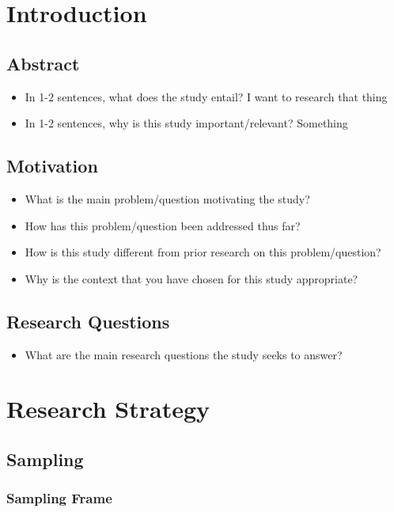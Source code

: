 \documentclass[12pt]{article}
\begin{document}
\section{Introduction}

\subsection{Abstract}

\begin{itemize}
\item In 1-2 sentences, what does the study entail? I want to research that thing
\item In 1-2 sentences, why is this study important/relevant? Something
\end{itemize}

\subsection{Motivation}

\begin{itemize}
\item What is the main problem/question motivating the study?
\item How has this problem/question been addressed thus far?
\item How is this study different from prior research on this problem/question? 
\item Why is the context that you have chosen for this study appropriate?
\end{itemize}

\subsection{Research Questions}

\begin{itemize}
\item What are the main research questions the study seeks to answer?
\end{itemize}

\section{Research Strategy}

\subsection{Sampling}

\subsubsection{Sampling Frame}
\end{document}
